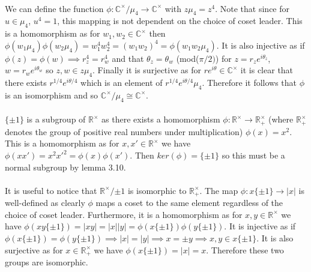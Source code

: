 \documentclass{article}
\begin{document}
\paragraph{}
We can define the function $\phi: \mathbb{C^\times}/\mu_4 \rightarrow \mathbb{C}^\times$ with 
$z\mu_4 = z^4$. Note that since for $u \in \mu_4$, $u^4 = 1$, this mapping is not dependent on the 
choice of coset leader.
This is a homomorphism as for $w_1,w_2 \in \mathbb{C}^\times$ then $\phi(w_1\mu_4)\phi(w_2\mu_4) = w_1^4w_2^4 = (w_1w_2)^4 = \phi(w_1w_2\mu_4)$. It is also 
injective as if $\phi(z) = \phi(w) \implies r_z^4 = r_w^4$ and that $\theta_z = \theta_w$ (mod($\pi/2)$) 
for $z = r_ze^{i\theta_z}$, $w = r_we^{i\theta_w}$ so $z,w \in z\mu_4$. Finally it is surjective 
as for $re^{i\theta} \in \mathbb{C}^\times$ it is clear that there exists $r^{1/4}e^{i\theta/4}$ 
which is an element of $r^{1/4}e^{i\theta/4}\mu_4$. Therefore it follows that $\phi$ is an 
isomorphism and so $\mathbb{C}^\times/\mu_4 \cong \mathbb{C}^\times$.

\paragraph{}
$\{\pm 1\}$ is a subgroup of $\mathbb{R}^\times$ as there exists a homomorphism $\phi:\mathbb{R}^\times \rightarrow \mathbb{R}^\times_+$ 
(where $\mathbb{R}^\times_+$ denotes the group of positive real numbers under multiplication) 
$\phi(x) = x^2$. This is a homomorphism as for $x,x' \in \mathbb{R}^\times$ we have $\phi(xx') = x^2x'^2 = \phi(x)\phi(x')$. 
Then $ker(\phi) = \{\pm 1\}$ so this must be a normal subgroup by lemma 3.10.

\paragraph{}
It is useful to notice that $\mathbb{R}^\times/{\pm 1}$ is isomorphic to $\mathbb{R}^\times_+$. The 
map $\phi: x\{\pm 1\} \rightarrow |x|$ is well-defined as clearly $\phi$ maps a coset to the same element 
regardless of the choice of coset leader. Furthermore, it is a homomorphism as 
for $x,y \in \mathbb{R}^\times$ we have $\phi(xy\{\pm 1\}) = |xy| = |x||y| = \phi(x\{\pm 1\})\phi(y\{\pm 1\})$. 
It is injective as if $\phi(x\{\pm 1\}) = \phi(y\{\pm 1\}) \implies |x| = |y| \implies x = \pm y \implies x,y \in x\{\pm 1\}$. 
It is also surjective as for $x \in \mathbb{R}^\times_+$ we have $\phi(x\{\pm 1\}) = |x| = x$. Therefore 
these two groups are isomorphic.
\end{document}
